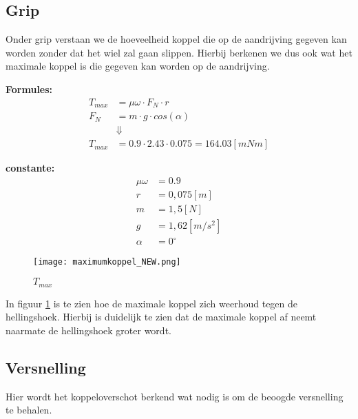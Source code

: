 \subsection{Grip}
    Onder grip verstaan we de hoeveelheid koppel die op de aandrijving gegeven kan worden zonder dat het wiel zal gaan slippen. Hierbij berkenen we dus ook wat het maximale koppel is die gegeven kan worden op de aandrijving.

    \begin{multicols}{2}
        \textbf{Formules:}
        \begin{equation}
            \begin{split}
                T_{max} &= \mu \omega \cdot F_{N} \cdot r \\
                F_{N} &= m \cdot g \cdot cos(\alpha) \\
                &\Downarrow \\
                T_{max} &= 0.9 \cdot 2.43 \cdot 0.075 = 164.03 [mNm]
            \end{split}
        \end{equation}

        \textbf{constante:}
        \begin{equation*}
            \begin{split}
                \mu \omega &= 0.9 \\
                r &= 0,075 [m] \\
                m &= 1,5 [N] \\
                g &= 1,62 [m/s^2] \\
                \alpha &= 0^\circ 
            \end{split}
        \end{equation*}
    \end{multicols}

    \begin{figure}[H]
        \centering
        \texttt{[image: maximumkoppel\_NEW.png]}
        \caption{$T_{max}$}
        \label{fig:peanut}
    \end{figure}

    In figuur \ref{fig:peanut} is te zien hoe de maximale koppel zich weerhoud tegen de hellingshoek. Hierbij is duidelijk te zien dat de maximale koppel af neemt naarmate de hellingshoek groter wordt.

\subsection{Versnelling}
    Hier wordt het koppeloverschot berkend wat nodig is om de beoogde versnelling te behalen. 

